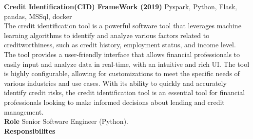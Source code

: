 \documentclass[a4paper]{article}
\begin{document}
{\textbf{Credit Identification(CID) FrameWork (2019)}} {\hfill Pyspark, Python, Flask, pandas, MSSql, docker}\\
\vspace{1mm}
The credit identification tool is a powerful software tool that leverages machine learning algorithms to identify and analyze various factors related to creditworthiness, such as credit history, employment status, and income level. The tool provides a user-friendly interface that allows financial professionals to easily input and analyze data in real-time, with an intuitive and rich UI. The tool is highly configurable, allowing for customizations to meet the specific needs of various industries and use cases. With its ability to quickly and accurately identify credit risks, the credit identification tool is an essential tool for financial professionals looking to make informed decisions about lending and credit management.\\
\vspace{1mm}
\textbf{Role}
Senior Software Engineer (Python).\\
\vspace*{1mm}
\textbf{Responsibilites} \\
\end{document}
